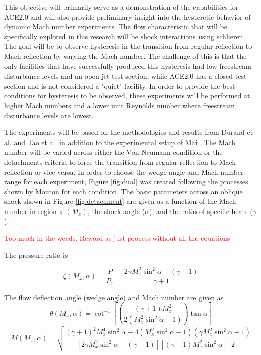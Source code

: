 This objective will primarily serve as a demonstration of the capabilities for ACE2.0 and will also provide preliminary insight into the hysteretic behavior of dynamic Mach number experiments. The flow characteristic that will be specifically explored in this research will be shock interactions using schlieren. The goal will be to observe hysteresis in the transition from regular reflection to Mach reflection by varying the Mach number. The challenge of this is that the only facilities that have successfully produced this hysteresis had low freestream disturbance levels and an open-jet test section, while ACE2.0 has a closed test section and is not considered a "quiet" facility. In order to provide the best conditions for hysteresis to be observed, these experiments will be performed at higher Mach numbers and a lower unit Reynolds number where freestream disturbance levels are lowest.

The experiments will be based on the methodologies and results from Durand et al. \cite{durand} and Tao et al. \cite{tao} in addition to the experimental setup of Mai \cite{mai-dis}. The Mach number will be varied across either the Von Neumann condition or the detachments criteria to force the transition from regular reflection to Mach reflection or vice versa. In order to choose the wedge angle and Mach number range for each experiment, Figure \ref{fig:dual} was created following the processes shown by Mouton \cite{mouton} for each condition. The basic parameters across an oblique shock shown in Figure \ref{fig:detachment} are given as a function of the Mach number in region x $\left(M_x\right)$, the shock angle ($\alpha$), and the ratio of specific heats ($\gamma$). 

\textcolor{red}{Too much in the weeds. Reword as just process without all the equations}

The pressure ratio is 

\begin{equation}
    \xi \left(M_x,\alpha\right) = \frac{P}{P_x} = \frac{2 \gamma M_x^2 \sin^2{\alpha} - (\gamma-1)}{\gamma+1}
\end{equation}

\noindent The flow deflection angle (wedge angle) and Mach number are given as
\begin{equation}
    \theta \left(M_x,\alpha\right) = \cot^{-1}{\left[ \left(\frac{(\gamma+1) M_x^2}{2\left(M_x^2 \sin^2{\alpha} - 1\right)}\right) \tan{\alpha} \right]}
\end{equation}
\begin{equation}
    M \left(M_x,\alpha\right) = \sqrt{\frac{(\gamma+1)^2 M_x^4 \sin^2{\alpha} - 4\left(M_x^2 \sin^2{\alpha} - 1\right)\left(\gamma M_x^2 \sin^2{\alpha} + 1\right)}{\left[2 \gamma M_x^2 \sin^2{\alpha} - (\gamma-1)\right]\left[(\gamma-1) M_x^2 \sin^2{\alpha} + 2\right]}}
\end{equation}

